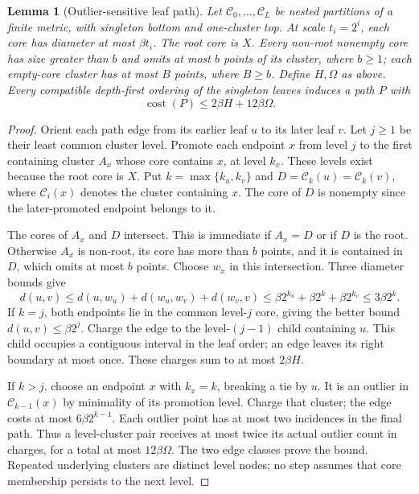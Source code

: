 \documentclass[acmsmall,11pt,nonacm]{acmart}
\newtheorem{lemma}[theorem]{Lemma}
\theoremstyle{definition}
\newcommand{\cost}{\operatorname{cost}}
\newcommand{\calC}{\mathcal C}
\begin{document}
\begin{lemma}[Outlier-sensitive leaf path]\label{lem:extract}
Let $\calC_0,\ldots,\calC_L$ be nested partitions of a finite metric,
with singleton bottom and one-cluster top. At scale $t_i=2^i$, each core
has diameter at most $\beta t_i$. The root core is $X$. Every non-root
nonempty core has size greater than $b$ and omits at most $b$ points of
its cluster, where $b\geq1$; each empty-core cluster has at most $B$ points,
where $B\geq b$. Define $H,\Omega$ as above. Every compatible depth-first
ordering of the singleton leaves induces a path $P$ with
\begin{equation}\label{eq:extraction}
 \cost(P)\leq2\beta H+12\beta\Omega.
\end{equation}
\end{lemma}
\begin{proof}
Orient each path edge from its earlier leaf $u$ to its later leaf $v$.
Let $j\geq1$ be their least common cluster level. Promote each endpoint
$x$ from level $j$ to the first containing cluster $A_x$ whose core
contains $x$, at level $k_x$. These levels exist because the root core
is $X$. Put $k=\max\{k_u,k_v\}$ and $D=\calC_k(u)=\calC_k(v)$,
where $\calC_i(x)$ denotes the cluster containing $x$.
The core of $D$ is nonempty since the later-promoted endpoint belongs to it.

The cores of $A_x$ and $D$ intersect. This is immediate if $A_x=D$ or
if $D$ is the root. Otherwise $A_x$ is non-root, its core has more than
$b$ points, and it is contained in $D$, which omits at most $b$ points.
Choose $w_x$ in this intersection. Three diameter bounds give
\[
 d(u,v)\leq d(u,w_u)+d(w_u,w_v)+d(w_v,v)
 \leq\beta2^{k_u}+\beta2^k+\beta2^{k_v}\leq3\beta2^k.
\]
If $k=j$, both endpoints lie in the common level-$j$ core, giving the
better bound $d(u,v)\leq\beta2^j$. Charge the edge to the level-$(j-1)$
child containing $u$. This child occupies a contiguous interval in the
leaf order; an edge leaves its right boundary at most once. These charges
sum to at most $2\beta H$.

If $k>j$, choose an endpoint $x$ with $k_x=k$, breaking a tie by $u$.
It is an outlier in $\calC_{k-1}(x)$ by minimality of its promotion level.
Charge that cluster; the edge costs at most $6\beta2^{k-1}$. Each outlier
point has at most two incidences in the final path. Thus a level-cluster
pair receives at most twice its actual outlier count in charges, for a
total at most $12\beta\Omega$. The two edge classes prove the bound.
Repeated underlying clusters are distinct level nodes; no step assumes
that core membership persists to the next level.
\end{proof}
\end{document}
